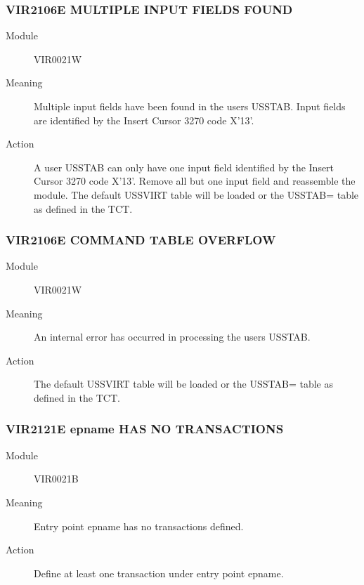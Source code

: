 \documentclass[letterpaper,10pt,english]{sphinxmanual}
\begin{document}
\subsubsection{VIR2106E MULTIPLE INPUT FIELDS FOUND}
\label{\detokenize{messages:vir2106e-multiple-input-fields-found}}\begin{description}
\item[{Module}] \leavevmode
VIR0021W

\item[{Meaning}] \leavevmode
Multiple input fields have been found in the users USSTAB. Input fields are identified by the Insert Cursor 3270 code X’13’.

\item[{Action}] \leavevmode
A user USSTAB can only have one input field identified by the Insert Cursor 3270 code X’13’. Remove all but one input field and reassemble the module. The default USSVIRT table will be loaded or the USSTAB= table as defined in the TCT.

\end{description}


\subsubsection{VIR2106E COMMAND TABLE OVERFLOW}
\label{\detokenize{messages:vir2106e-command-table-overflow}}\begin{description}
\item[{Module}] \leavevmode
VIR0021W

\item[{Meaning}] \leavevmode
An internal error has occurred in processing the users USSTAB.

\item[{Action}] \leavevmode
The default USSVIRT table will be loaded or the USSTAB= table as defined in the TCT.

\end{description}


\subsubsection{VIR2121E epname HAS NO TRANSACTIONS}
\label{\detokenize{messages:vir2121e-epname-has-no-transactions}}\begin{description}
\item[{Module}] \leavevmode
VIR0021B

\item[{Meaning}] \leavevmode
Entry point epname has no transactions defined.

\item[{Action}] \leavevmode
Define at least one transaction under entry point epname.

\end{description}
\end{document}
